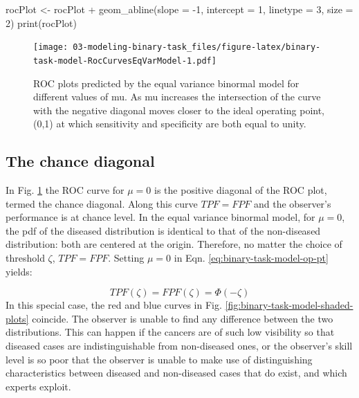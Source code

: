 \documentclass[
]{book}
\newenvironment{Shaded}{\begin{snugshade}}{\end{snugshade}}
\newcommand{\AttributeTok}[1]{\textcolor[rgb]{0.77,0.63,0.00}{#1}}
\newcommand{\DecValTok}[1]{\textcolor[rgb]{0.00,0.00,0.81}{#1}}
\newcommand{\FunctionTok}[1]{\textcolor[rgb]{0.00,0.00,0.00}{#1}}
\newcommand{\NormalTok}[1]{#1}
\newcommand{\OtherTok}[1]{\textcolor[rgb]{0.56,0.35,0.01}{#1}}
\newcommand{\SpecialCharTok}[1]{\textcolor[rgb]{0.00,0.00,0.00}{#1}}
\begin{document}
\begin{Shaded}
\begin{Highlighting}[]
\NormalTok{rocPlot }\OtherTok{\textless{}{-}}\NormalTok{ rocPlot }\SpecialCharTok{+} 
  \FunctionTok{geom\_abline}\NormalTok{(}\AttributeTok{slope =} \SpecialCharTok{{-}}\DecValTok{1}\NormalTok{, }
              \AttributeTok{intercept =} \DecValTok{1}\NormalTok{, }
              \AttributeTok{linetype =} \DecValTok{3}\NormalTok{,}
              \AttributeTok{size =} \DecValTok{2}\NormalTok{)}
\FunctionTok{print}\NormalTok{(rocPlot)}
\end{Highlighting}
\end{Shaded}

\begin{figure}
\centering
\texttt{[image: 03-modeling-binary-task\_files/figure-latex/binary-task-model-RocCurvesEqVarModel-1.pdf]}
\caption{\label{fig:binary-task-model-RocCurvesEqVarModel}ROC plots predicted by the equal variance binormal model for different values of mu. As mu increases the intersection of the curve with the negative diagonal moves closer to the ideal operating point, (0,1) at which sensitivity and specificity are both equal to unity.}
\end{figure}

\hypertarget{binary-task-model-chance-diagonal}{%
\subsection{The chance diagonal}\label{binary-task-model-chance-diagonal}}

In Fig. \ref{fig:binary-task-model-RocCurvesEqVarModel} the ROC curve for \(\mu=0\) is the positive diagonal of the ROC plot, termed the chance diagonal. Along this curve \(TPF = FPF\) and the observer's performance is at chance level. In the equal variance binormal model, for \(\mu=0\), the pdf of the diseased distribution is identical to that of the non-diseased distribution: both are centered at the origin. Therefore, no matter the choice of threshold \(\zeta\), \(TPF = FPF\). Setting \(\mu=0\) in Eqn. \eqref{eq:binary-task-model-op-pt} yields:

\[TPF\left ( \zeta \right )=FPF\left ( \zeta \right )=\Phi\left ( -\zeta \right )\]
In this special case, the red and blue curves in Fig. \ref{fig:binary-task-model-shaded-plots} coincide. The observer is unable to find any difference between the two distributions. This can happen if the cancers are of such low visibility so that diseased cases are indistinguishable from non-diseased ones, or the observer's skill level is so poor that the observer is unable to make use of distinguishing characteristics between diseased and non-diseased cases that do exist, and which experts exploit.
\end{document}
